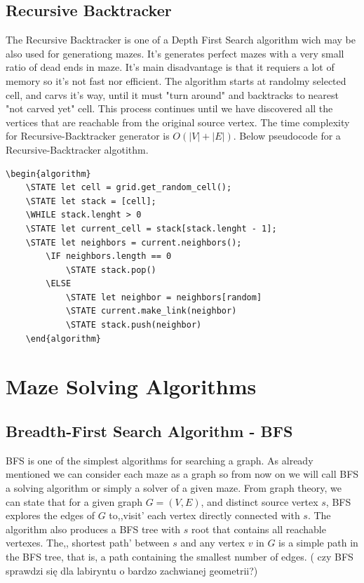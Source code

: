 \subsection{Recursive Backtracker}
The Recursive Backtracker is one of a Depth First Search algorithm wich may be also used for generationg mazes. It's generates perfect mazes with a very small ratio of dead ends in maze. It's main disadvantage is that it requiers a lot of memory so it's not fast nor efficient. The algorithm starts at randolmy selected cell, and carvs it's way, until it must "turn around" and backtracks to nearest "not carved yet" cell. This process continues until we have discovered all the vertices that are reachable from the original source vertex. The time complexity for Recursive-Backtracker generator is $O(|V|+|E|)$. Below pseudocode for a Recursive-Backtracker algotithm.
\begin{lstlisting}[caption={Pseudocode for a Recursive-Backtracker algorithm}]
	\begin{algorithm}
	\STATE let cell = grid.get_random_cell();
	\STATE let stack = [cell];
	\WHILE stack.lenght > 0
	\STATE let current_cell = stack[stack.lenght - 1];
	\STATE let neighbors = current.neighbors();
		\IF neighbors.length == 0
			\STATE stack.pop()
		\ELSE 
			\STATE let neighbor = neighbors[random]
			\STATE current.make_link(neighbor)
			\STATE stack.push(neighbor)	
	\end{algorithm}
	\end{lstlisting}
\section{Maze Solving Algorithms}
\subsection{Breadth-First Search Algorithm - BFS}
BFS is one of the simplest algorithms for searching a graph. As already mentioned we can consider each maze as a graph so from now on we will call 
BFS a solving algorithm or simply a solver of a given maze. From graph theory, we can state that for a given graph $ G = ( V, E) $, and distinct source 
vertex $s$, BFS explores the edges of $G$ to,,visit' each vertex directly connected with $s$. The algorithm also produces a BFS tree with $s$ root that 
contains all reachable vertexes. The,, shortest path' between $s$ and any vertex $v$ in $G$ is a simple path in the BFS tree, that is, a path containing
the smallest number of edges. \cite{3} ( czy BFS sprawdzi się dla labiryntu o bardzo zachwianej geometrii?)
